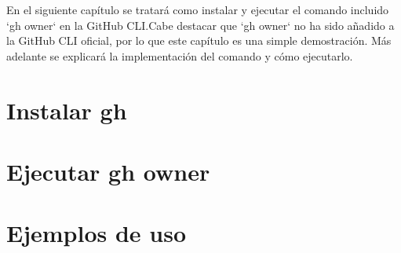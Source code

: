 En el siguiente capítulo se tratará como instalar y ejecutar el comando incluido `gh owner` en la GitHub CLI.Cabe destacar que `gh owner` no ha sido añadido a la GitHub CLI oficial, por lo que este capítulo es una simple demostración. Más adelante se explicará la implementación del comando y cómo ejecutarlo.

\section{Instalar gh}

\section{Ejecutar gh owner}

\section{Ejemplos de uso}

